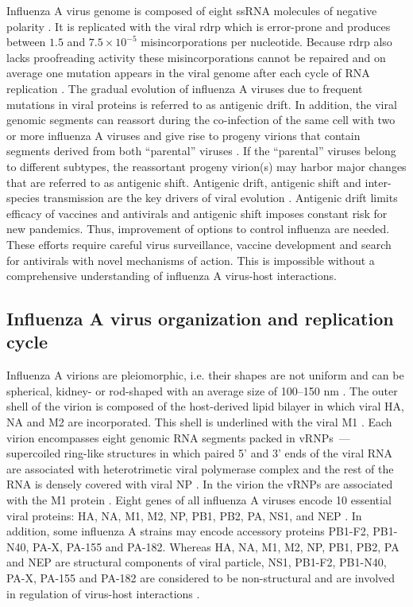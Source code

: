 	Influenza A virus genome is composed of eight \gls{ssRNA} molecules of negative polarity  \parencite{Palese1977}. It is replicated with the viral \gls{rdrp} which is error-prone and produces between $1.5$ and $7.5\times10^{-5}$ misincorporations per nucleotide. Because \gls{rdrp} also lacks proofreading activity these misincorporations cannot be repaired and on average one mutation appears in the viral genome after each  cycle of RNA replication \parencite{Drake1993, Parvin1986}. The gradual evolution of influenza A viruses due to frequent mutations in viral proteins is referred to as antigenic drift. In addition, the viral genomic segments can reassort during the co-infection of the same cell with two or more influenza A viruses and give rise to progeny virions that contain segments derived from both ``parental'' viruses \parencite{McGeoch1976, Desselberger1978}. If the ``parental'' viruses belong to different subtypes, the reassortant progeny virion(s) may harbor major changes that are referred to as antigenic shift. Antigenic drift, antigenic shift and inter-species transmission are the key drivers of viral evolution \parencite{Forrest2010}. Antigenic drift limits efficacy of vaccines and  antivirals and antigenic shift imposes constant risk for new pandemics. Thus, improvement of options to control influenza are needed. These efforts require careful virus surveillance, vaccine development and search for antivirals with novel mechanisms of action. This is impossible without a comprehensive understanding of influenza A virus-host interactions.
	
\subsection{Influenza A virus organization and replication cycle}

	Influenza A virions are pleiomorphic, i.e. their shapes are not uniform and can be spherical, kidney- or rod-shaped with an average size of 100--150 nm \parencite{Fujiyoshi1994}. The outer shell of the virion is composed of the host-derived lipid bilayer in which viral \gls{HA}, \gls{NA} and \gls{M2} are incorporated. This shell is underlined with the viral \gls{M1} \parencite{Harris2006}. Each virion encompasses eight genomic RNA segments packed in \glspl{vRNP}~--- supercoiled ring-like structures in which paired 5' and 3' ends of the viral RNA are associated with heterotrimetic viral polymerase complex and the rest of the RNA is densely covered with viral \gls{NP} \parencite{Arranz2012}. In the virion the \glspl{vRNP} are associated with the \gls{M1} protein \parencite{Rees1982, Ye1999}. Eight genes of all influenza A viruses encode 10 essential viral proteins: \gls{HA}, \gls{NA}, \gls{M1}, \gls{M2}, \gls{NP}, \gls{PB1}, \gls{PB2}, \gls{PA}, \gls{NS1}, and \gls{NEP} \parencite{Lamb1983}. In addition, some influenza A strains may encode accessory proteins PB1-F2, PB1-N40, PA-X, PA-155 and PA-182. Whereas \gls{HA}, \gls{NA}, \gls{M1}, \gls{M2}, \gls{NP}, \gls{PB1}, \gls{PB2}, \gls{PA} and \gls{NEP} are structural components of viral particle, \gls{NS1}, PB1-F2, PB1-N40, PA-X, PA-155 and PA-182 are considered to be non-structural and are involved in regulation of virus-host interactions \parencite{Chen2001,Hale2008b,Wise2009,Jagger2012,Muramoto2013}.
	
